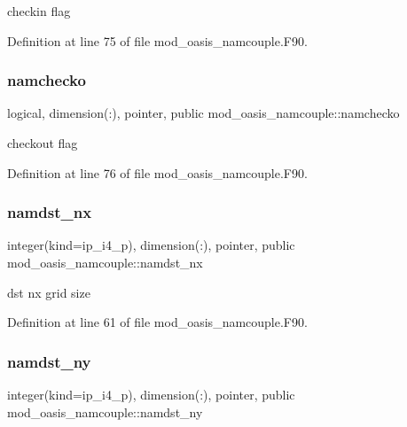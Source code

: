 checkin flag 



Definition at line 75 of file mod\+\_\+oasis\+\_\+namcouple.\+F90.

\mbox{\label{namespacemod__oasis__namcouple_a58c011820e55c9af9f306fbb1d45eb23}} 
\subsubsection{\texorpdfstring{namchecko}{namchecko}}
{\footnotesize\ttfamily logical, dimension(\+:), pointer, public mod\+\_\+oasis\+\_\+namcouple\+::namchecko}



checkout flag 



Definition at line 76 of file mod\+\_\+oasis\+\_\+namcouple.\+F90.

\mbox{\label{namespacemod__oasis__namcouple_a6add94418eefdaefd78cd971888a5826}} 
\subsubsection{\texorpdfstring{namdst\+\_\+nx}{namdst\_nx}}
{\footnotesize\ttfamily integer(kind=ip\+\_\+i4\+\_\+p), dimension(\+:), pointer, public mod\+\_\+oasis\+\_\+namcouple\+::namdst\+\_\+nx}



dst nx grid size 



Definition at line 61 of file mod\+\_\+oasis\+\_\+namcouple.\+F90.

\mbox{\label{namespacemod__oasis__namcouple_a9035fc89396bad9574c88642d3aac5f0}} 
\subsubsection{\texorpdfstring{namdst\+\_\+ny}{namdst\_ny}}
{\footnotesize\ttfamily integer(kind=ip\+\_\+i4\+\_\+p), dimension(\+:), pointer, public mod\+\_\+oasis\+\_\+namcouple\+::namdst\+\_\+ny}



